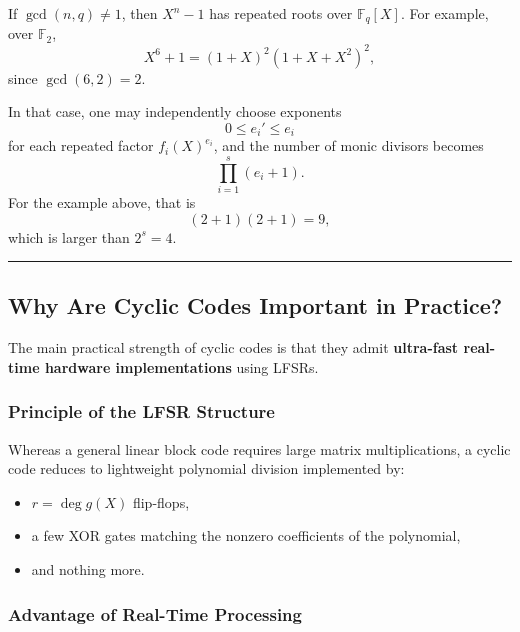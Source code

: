 \documentclass[
]{article}
\providecommand{\tightlist}{%
  \setlength{\itemsep}{0pt}\setlength{\parskip}{0pt}}
\begin{document}
If \(\gcd(n,q) \neq 1\), then \(X^n-1\) has repeated roots over
\(\mathbb{F}_q[X]\). For example, over \(\mathbb{F}_2\),
\[X^6+1=(1+X)^2(1+X+X^2)^2,\] since \(\gcd(6,2)=2\).

In that case, one may independently choose exponents
\[0 \le e_i' \le e_i\] for each repeated factor \(f_i(X)^{e_i}\), and
the number of monic divisors becomes \[\prod_{i=1}^s (e_i+1).\] For the
example above, that is \[(2+1)(2+1)=9,\] which is larger than \(2^s=4\).

\begin{center}\rule{0.5\linewidth}{0.5pt}\end{center}

\subsection{Why Are Cyclic Codes Important in
Practice?}\label{why-are-cyclic-codes-important-in-practice}

The main practical strength of cyclic codes is that they admit
\textbf{ultra-fast real-time hardware implementations} using LFSRs.

\subsubsection{Principle of the LFSR
Structure}\label{principle-of-the-lfsr-structure}

Whereas a general linear block code requires large matrix
multiplications, a cyclic code reduces to lightweight polynomial
division implemented by:

\begin{itemize}
\tightlist
\item
  \(r=\deg g(X)\) flip-flops,
\item
  a few XOR gates matching the nonzero coefficients of the polynomial,
\item
  and nothing more.
\end{itemize}

\subsubsection{Advantage of Real-Time
Processing}\label{advantage-of-real-time-processing}
\end{document}
